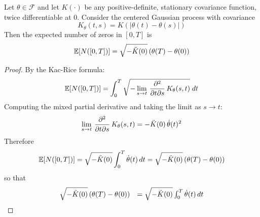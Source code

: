 \documentclass{mc}
\begin{document}
\begin{theorem}
  Let $\theta \in \mathcal{F}$ and let $K (\cdot)$ be any positive-definite,
  stationary covariance function, twice differentiable at $0$. Consider the
  centered Gaussian process with covariance
  \begin{equation}
    K_{\theta} (t, s) = K (| \theta (t) - \theta (s) |)
  \end{equation}
  Then the expected number of zeros in $[0, T]$ is
  \begin{equation}
    \mathbb{E} [N ([0, T])] = \sqrt{- \ddot{K} (0)}  \hspace{0.17em} (\theta
    (T) - \theta (0))
  \end{equation}
\end{theorem}

\begin{proof}
  By the Kac-Rice
  formula{\cite[10.3.1]{stationaryAndRelatedStochasticProcesses}}:
  \begin{equation}
    \mathbb{E} [N ([0, T])] = \int_0^T \sqrt{- \lim_{s \to t}  \hspace{0.17em}
    \frac{\partial^2}{\partial t \partial s}  \hspace{0.17em} K_{\theta} (s,
    t)}  \hspace{0.27em} dt
  \end{equation}
  Computing the mixed partial derivative and taking the limit as $s \to t$:
  \begin{equation}
    \lim_{s \to t}  \hspace{0.17em} \frac{\partial^2}{\partial t \partial s} 
    \hspace{0.17em} K_{\theta} (s, t) = - \ddot{K} (0) \hspace{0.17em}
    \dot{\theta} (t)^2
  \end{equation}
  Therefore
  \begin{equation}
    \mathbb{E} [N ([0, T])] = \sqrt{- \ddot{K} (0)}  \int_0^T \dot{\theta} (t)
    \hspace{0.17em} dt = \sqrt{- \ddot{K} (0)}  \hspace{0.17em} (\theta (T) -
    \theta (0))
  \end{equation}
  so that
  \begin{equation}
    \begin{array}{ll}
      \sqrt{- \ddot{K} (0)}  \hspace{0.17em} (\theta (T) - \theta (0)) & =
      \sqrt{- \ddot{K} (0)}  \int_0^T \dot{\theta} (t)  \hspace{0.17em} dt\\

\end{array}
\end{equation}
\end{proof}
\end{document}
